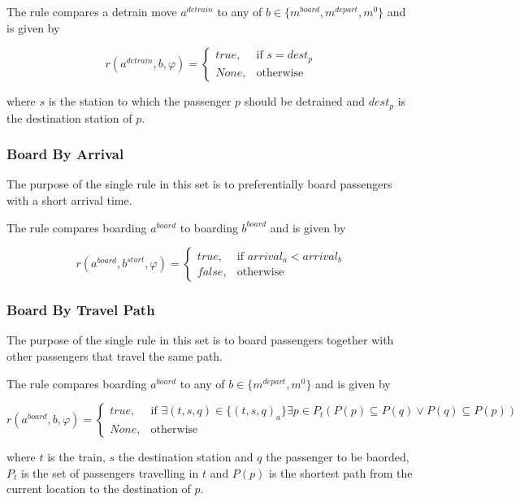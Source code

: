\documentclass[a4paper,10pt,parskip]{article}
\begin{document}
The rule compares a detrain move $a^{detrain}$ to any of 
$b \in \{m^{board}, m^{depart}, m^0\}$ and is given by

\[
    r(a^{detrain}, b, \varphi) = 
    \begin{cases}
        true,& \text{if } s = dest_p\\
        None,& \text{otherwise}
    \end{cases}
\]

where $s$ is the station to which the passenger $p$ should be detrained and 
$dest_p$ is the destination station of $p$.


\subsubsection{Board By Arrival}
\label{rule:3}

The purpose of the single rule in this set is to preferentially board passengers 
with a short arrival time. 

The rule compares boarding $a^{board}$ to boarding $b^{board}$ and 
is given by

\[
    r(a^{board}, b^{start}, \varphi) = 
    \begin{cases}
        true,& \text{if } arrival_a < arrival_b\\
        false,& \text{otherwise}
    \end{cases}
\]

\subsubsection{Board By Travel Path}
\label{rule:4}

The purpose of the single rule in this set is to board passengers together with 
other passengers that travel the same path.

The rule compares boarding $a^{board}$ to any of $b \in \{m^{depart}, m^0\}$ and 
is given by

\[
    r(a^{board}, b, \varphi) = 
    \begin{cases}
        true,& \text{if } \exists (t,s,q) \in \{(t,s,q)_a\} \exists p \in P_t (P(p) \subseteq P(q) \lor P(q) \subseteq P(p))\\
        None,& \text{otherwise}
    \end{cases}
\]

where $t$ is the train, $s$ the destination station and $q$ the passenger to be 
baorded, $P_t$ is the set of passengers travelling in $t$ and $P(p)$ is 
the shortest path from the current location to the destination of $p$.
\end{document}
